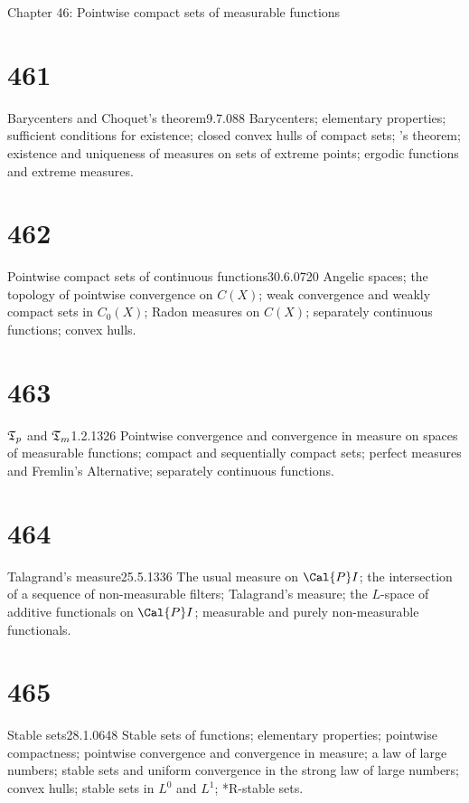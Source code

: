 Chapter 46: Pointwise compact sets of measurable functions


\section{461}{Barycenters and Choquet's theorem}{9.7.08}{8}{}
{Barycenters;  elementary properties;  sufficient conditions for
existence;  closed convex hulls of compact sets;  \Krein's theorem;
existence and uniqueness of measures on sets of extreme points;  ergodic
functions and extreme measures.}

\section{462}{Pointwise compact sets of continuous
functions}{30.6.07}{20}{}
{Angelic spaces;  the topology of pointwise convergence on $C(X)$;  weak
convergence and weakly compact sets in $C_0(X)$;  Radon measures on
$C(X)$;  separately continuous functions;  convex hulls.}

\section{463}{$\frak{T}_p$ and $\frak{T}_m$}{1.2.13}{26}{}
{Pointwise convergence and convergence in measure on spaces of
measurable functions;  compact and sequentially compact sets;  perfect
measures and Fremlin's Alternative;  separately continuous
functions.}

\section{464}{Talagrand's measure}{25.5.13}{36}{}
{The usual measure on
$\Cal{P}I$;  the intersection of a sequence of non-measurable filters;
Talagrand's measure;  the $L$-space of additive functionals on
$\Cal{P}I$;  measurable and purely non-measurable functionals.}

\ifdim\pagewidth>467pt\fontdimen3\tenrm=2pt\fi

\section{465}{Stable sets}{28.1.06}{48}{}
{Stable sets of functions;  elementary properties;  pointwise
compactness;  pointwise convergence and convergence in measure;   a law
of large numbers;  stable sets and uniform convergence in the strong law
of large numbers;  convex hulls;
stable sets in $L^0$ and $L^1$;  *R-stable sets.}
\tenrm=1.67pt

